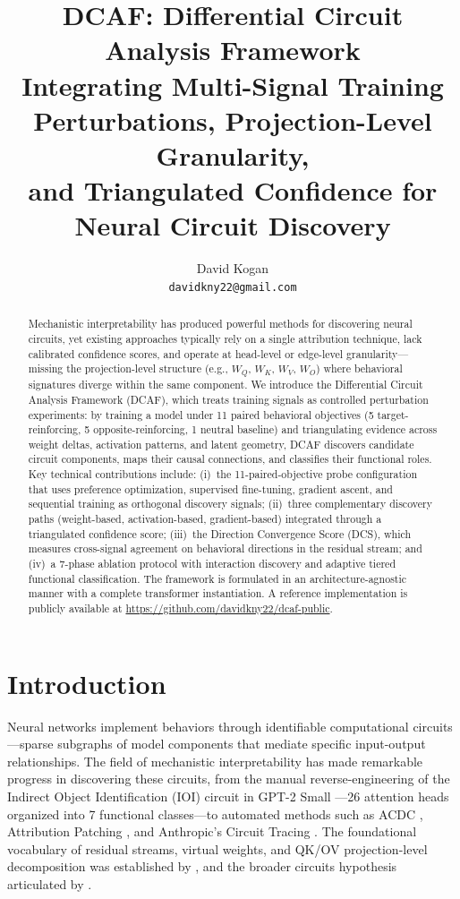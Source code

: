 \documentclass[11pt]{article}
\title{\textbf{DCAF: Differential Circuit Analysis Framework}\\[0.5em]
\large Integrating Multi-Signal Training Perturbations, Projection-Level Granularity,\\and Triangulated Confidence for Neural Circuit Discovery}
\author{David Kogan\\
\texttt{davidkny22@gmail.com}}
\date{}
\begin{document}
\maketitle

\begin{abstract}
\noindent
Mechanistic interpretability has produced powerful methods for discovering neural circuits, yet existing approaches typically rely on a single attribution technique, lack calibrated confidence scores, and operate at head-level or edge-level granularity---missing the projection-level structure (e.g., $W_Q$, $W_K$, $W_V$, $W_O$) where behavioral signatures diverge within the same component. We introduce the Differential Circuit Analysis Framework (DCAF), which treats training signals as controlled perturbation experiments: by training a model under 11 paired behavioral objectives (5 target-reinforcing, 5 opposite-reinforcing, 1 neutral baseline) and triangulating evidence across weight deltas, activation patterns, and latent geometry, DCAF discovers candidate circuit components, maps their causal connections, and classifies their functional roles. Key technical contributions include: (i)~the 11-paired-objective probe configuration that uses preference optimization, supervised fine-tuning, gradient ascent, and sequential training as orthogonal discovery signals; (ii)~three complementary discovery paths (weight-based, activation-based, gradient-based) integrated through a triangulated confidence score; (iii)~the Direction Convergence Score (DCS), which measures cross-signal agreement on behavioral directions in the residual stream; and (iv)~a 7-phase ablation protocol with interaction discovery and adaptive tiered functional classification. The framework is formulated in an architecture-agnostic manner with a complete transformer instantiation. A reference implementation is publicly available at \url{https://github.com/davidkny22/dcaf-public}.
\end{abstract}

\section{Introduction}
\label{sec:introduction}

Neural networks implement behaviors through identifiable computational circuits---sparse subgraphs of model components that mediate specific input-output relationships. The field of mechanistic interpretability has made remarkable progress in discovering these circuits, from the manual reverse-engineering of the Indirect Object Identification (IOI) circuit in GPT-2 Small \citep{wang2023ioi}---26 attention heads organized into 7 functional classes---to automated methods such as ACDC \citep{conmy2023acdc}, Attribution Patching \citep{syed2024attribution}, and Anthropic's Circuit Tracing \citep{ameisen2025tracing}. The foundational vocabulary of residual streams, virtual weights, and QK/OV projection-level decomposition was established by \citet{elhage2021mathematical}, and the broader circuits hypothesis articulated by \citet{olah2020zoom}.
\end{document}
